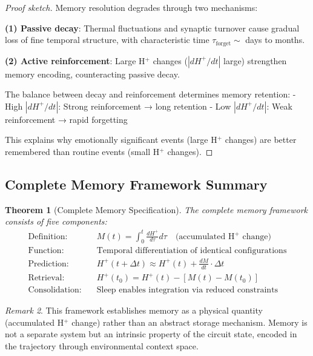 \documentclass[aps,prd,twocolumn,superscriptaddress,floatfix,nofootinbib]{revtex4-2}
\newtheorem{theorem}{Theorem}[section]
\theoremstyle{remark}
\newtheorem{remark}[theorem]{Remark}
\begin{document}
\begin{proof}[Proof sketch]
Memory resolution degrades through two mechanisms:

\textbf{(1) Passive decay}: Thermal fluctuations and synaptic turnover cause gradual loss of fine temporal structure, with characteristic time $\tau_{\text{forget}} \sim$ days to months.

\textbf{(2) Active reinforcement}: Large H$^+$ changes ($|dH^+/dt|$ large) strengthen memory encoding, counteracting passive decay.

The balance between decay and reinforcement determines memory retention:
- High $|dH^+/dt|$: Strong reinforcement → long retention
- Low $|dH^+/dt|$: Weak reinforcement → rapid forgetting

This explains why emotionally significant events (large H$^+$ changes) are better remembered than routine events (small H$^+$ changes).
\end{proof}

\subsection{Complete Memory Framework Summary}

\begin{theorem}[Complete Memory Specification]
\label{thm:complete_memory}
The complete memory framework consists of five components:
\begin{align}
\text{Definition:} \quad & M(t) = \int_0^t \frac{dH^+}{d\tau} d\tau \quad \text{(accumulated H$^+$ change)} \\
\text{Function:} \quad & \text{Temporal differentiation of identical configurations} \\
\text{Prediction:} \quad & H^+(t + \Delta t) \approx H^+(t) + \frac{dM}{dt} \cdot \Delta t \\
\text{Retrieval:} \quad & H^+(t_0) = H^+(t) - [M(t) - M(t_0)] \\
\text{Consolidation:} \quad & \text{Sleep enables integration via reduced constraints}
\end{align}
\end{theorem}

\begin{remark}
This framework establishes memory as a physical quantity (accumulated H$^+$ change) rather than an abstract storage mechanism. Memory is not a separate system but an intrinsic property of the circuit state, encoded in the trajectory through environmental context space.
\end{remark}
\end{document}
